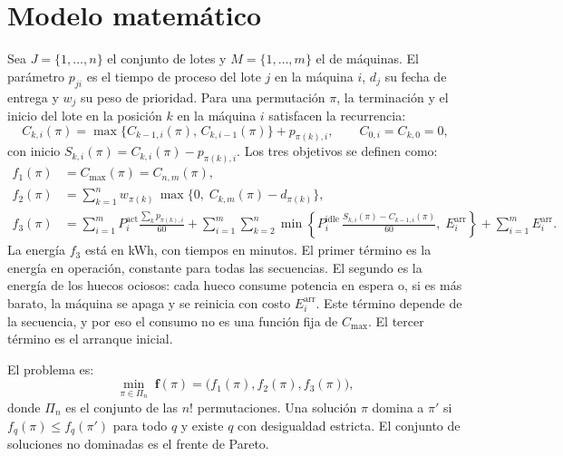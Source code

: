 \documentclass[11pt,a4paper]{article}
\begin{document}
\section{Modelo matemático}
Sea $J=\{1,\dots,n\}$ el conjunto de lotes y $M=\{1,\dots,m\}$ el de máquinas. El parámetro $p_{ji}$ es el tiempo de proceso del lote $j$ en la máquina $i$, $d_j$ su fecha de entrega y $w_j$ su peso de prioridad. Para una permutación $\pi$, la terminación y el inicio del lote en la posición $k$ en la máquina $i$ satisfacen la recurrencia:
\begin{equation}
C_{k,i}(\pi)=\max\{C_{k-1,i}(\pi),\,C_{k,i-1}(\pi)\}+p_{\pi(k),i},\qquad C_{0,i}=C_{k,0}=0,
\label{eq:recurrencia}
\end{equation}
con inicio $S_{k,i}(\pi)=C_{k,i}(\pi)-p_{\pi(k),i}$. Los tres objetivos se definen como:
\begin{align}
f_1(\pi) &= C_{\max}(\pi)=C_{n,m}(\pi), \label{eq:f1}\\
f_2(\pi) &= \sum_{k=1}^{n} w_{\pi(k)}\,\max\{0,\;C_{k,m}(\pi)-d_{\pi(k)}\}, \label{eq:f2}\\
f_3(\pi) &= \sum_{i=1}^{m} P_i^{\mathrm{act}}\frac{\sum_{k} p_{\pi(k),i}}{60}
  + \sum_{i=1}^{m}\sum_{k=2}^{n}\min\!\left\{P_i^{\mathrm{idle}}\,\frac{S_{k,i}(\pi)-C_{k-1,i}(\pi)}{60},\;E_i^{\mathrm{arr}}\right\}
  + \sum_{i=1}^{m}E_i^{\mathrm{arr}}. \label{eq:f3}
\end{align}
La energía $f_3$ está en kWh, con tiempos en minutos. El primer término es la energía en operación, constante para todas las secuencias. El segundo es la energía de los huecos ociosos: cada hueco consume potencia en espera o, si es más barato, la máquina se apaga y se reinicia con costo $E_i^{\mathrm{arr}}$. Este término depende de la secuencia, y por eso el consumo no es una función fija de $C_{\max}$. El tercer término es el arranque inicial.

El problema es:
\begin{equation}
\min_{\pi\in\Pi_n}\;\mathbf{f}(\pi)=\big(f_1(\pi),f_2(\pi),f_3(\pi)\big),
\label{eq:problema}
\end{equation}
donde $\Pi_n$ es el conjunto de las $n!$ permutaciones. Una solución $\pi$ domina a $\pi'$ si $f_q(\pi)\leq f_q(\pi')$ para todo $q$ y existe $q$ con desigualdad estricta. El conjunto de soluciones no dominadas es el frente de Pareto.
\end{document}
